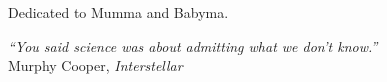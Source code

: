 
\begin{dedication} 


\vspace*{100mm}

Dedicated to Mumma and Babyma.

\vspace*{\fill}


\textit{“You said science was about admitting what we don't know.”}\\
Murphy Cooper, \textit{Interstellar}
\end{dedication}
